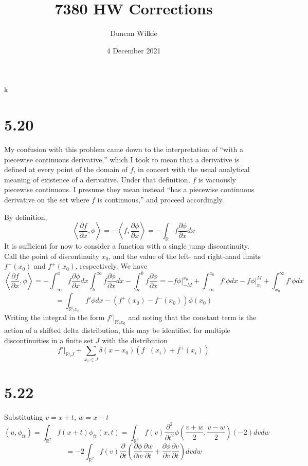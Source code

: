 k\documentclass{article}
\title{7380 HW Corrections}
\author{Duncan Wilkie}
\date{4 December 2021}
\begin{document}
\maketitle

\section*{5.20}
My confusion with this problem came down to the interpretation of ``with a piecewise continuous derivative,'' which I took to mean that a derivative is defined at every point of the domain of $f$, in concert with the usual analytical meaning of existence of a derivative. Under that definition, $f$ is vacuously piecewise continuous. I presume they mean instead ``has a piecewise continuous derivative on the set where $f$ is continuous,'' and proceed accordingly.

By definition,
\[\left\langle\frac{\partial f}{\partial x}, \phi\right\rangle=-\left\langle f, \frac{\partial \phi}{\partial x} \right\rangle=-\int_\mathbb{R} f\frac{\partial \phi}{\partial x}dx\]
It is sufficient for now to consider a function with a single jump discontinuity. Call the point of discontinuity $x_0$, and the value of the left- and right-hand limits $f^-(x_0)$ and $f^+(x_0)$, respectively. We have
\[\left\langle\frac{\partial f}{\partial x},\phi\right\rangle=-\int_{-\infty}^{a}f\frac{\partial\phi}{\partial x}dx\int_{b}^\infty f\frac{\partial\phi}{\partial x}dx - \int_a^bf\frac{\partial \phi}{\partial x}=-f\phi\bigg|_{-M}^{x_0}+\int_{-\infty}^{x_0}f'\phi dx-f\phi\bigg|_{x_0}^{M}+\int_{x_0}^\infty f'\phi dx\]\[=\int_{\mathbb{R}\setminus x_0}f'\phi dx-(f^+(x_0)-f^-(x_0))\phi(x_0)\]
Writing the integral in the form $f'\bigg|_{\mathbb{R}\setminus x_0}$ and noting that the constant term is the action of a shifted delta distribution, this may be identified for multiple discontinuities in a finite set $J$ with the distribution
\[f'\bigg|_{\mathbb{R}\setminus J}+\sum_{x_i\in J}\delta(x-x_0)(f^-(x_i)+f^+(x_i))\]

\section*{5.22}
Substituting $v=x+t$, $w=x-t$
\[(u, \phi_{tt})=\int_{\mathbb{R}^2}f(x+t)\phi_{tt}(x,t)=\int_{\mathbb{R}^2}f(v)\frac{\partial^2}{\partial t^2} \phi\left(\frac{v+w}{2},\frac{v-w}{2}\right)(-2)dvdw\]
\[=-2\int_{\mathbb{R}^2}f(v)\frac{\partial}{\partial t}\left( \frac{\partial \phi}{\partial w}\frac{\partial w}{\partial t}+\frac{\partial \phi}{\partial v}\frac{\partial v}{\partial t} \right)dvdw\]
\end{document}
